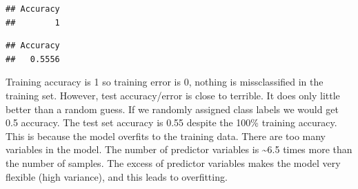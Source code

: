 \documentclass[12pt,]{krantz}
\newenvironment{Shaded}{\begin{snugshade}}{\end{snugshade}}
\newcommand{\CommentTok}[1]{\textcolor[rgb]{0.56,0.35,0.01}{\textit{#1}}}
\newcommand{\DataTypeTok}[1]{\textcolor[rgb]{0.13,0.29,0.53}{#1}}
\newcommand{\DecValTok}[1]{\textcolor[rgb]{0.00,0.00,0.81}{#1}}
\newcommand{\KeywordTok}[1]{\textcolor[rgb]{0.13,0.29,0.53}{\textbf{#1}}}
\newcommand{\NormalTok}[1]{#1}
\newcommand{\OperatorTok}[1]{\textcolor[rgb]{0.81,0.36,0.00}{\textbf{#1}}}
\newcommand{\StringTok}[1]{\textcolor[rgb]{0.31,0.60,0.02}{#1}}
\begin{document}
\begin{Shaded}
\end{Shaded}

\begin{verbatim}
## Accuracy 
##        1
\end{verbatim}

\begin{Shaded}
\end{Shaded}

\begin{verbatim}
## Accuracy 
##   0.5556
\end{verbatim}

Training accuracy is 1 so training error is 0, nothing is missclassified in the training set. However, test accuracy/error is close to terrible. It does only little better than a random guess. If we randomly assigned class labels we would get 0.5 accuracy. The test set accuracy is 0.55 despite the 100\% training accuracy. This is because the model overfits to the training data. There are too many variables in the model. The number of predictor variables is \textasciitilde{}6.5 times more than the number of samples. The excess of predictor variables makes the model very flexible (high variance), and this leads to overfitting.
\end{document}
